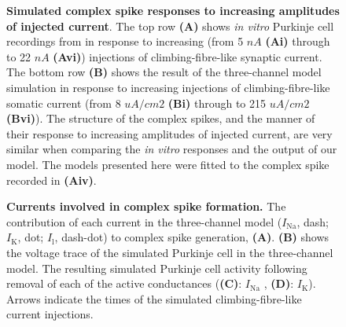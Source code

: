 \documentclass[utf8]{frontiersSCNS} %
\renewcommand{\k}{\mathrm{K}}
\newcommand{\na}{\mathrm{Na}}
\newcommand{\leak}{\mathrm{l}}
\begin{document}

%


\begin{figure}[!ht]
\caption{\textbf{Simulated complex spike responses to increasing
    amplitudes of injected current}. The top row \textbf{(A)} shows \textsl{in
    vitro} Purkinje cell recordings from \protect\cite{DavieEtAl2008} in response to increasing (from 5 $nA$ \textbf{(Ai)} through to 22 $nA$ \textbf{(Avi)}) injections of climbing-fibre-like synaptic current. The bottom row \textbf{(B)} shows
  the result of the three-channel model simulation in response to increasing injections of climbing-fibre-like somatic current (from 8 $uA/cm2$ \textbf{(Bi)} through to 215 $uA/cm2$ \textbf{(Bvi)}). The structure of the complex spikes, and the manner of their response to increasing amplitudes of injected current, are very similar when comparing the \textsl{in vitro} responses and the output of our model. The models presented here were fitted to the complex spike recorded in \textbf{(Aiv)}.}
\label{injection_amplitudes}
\end{figure}



\begin{figure}[!ht]
\caption{\textbf{Currents involved in complex spike formation.} The
contribution of each current in the three-channel model ($I_{\na}$,
dash; $I_{\k}$, dot; $I_{\leak}$, dash-dot) to
complex spike generation, \textbf{(A)}. \textbf{(B)} shows the
 voltage trace of the simulated Purkinje cell in the three-channel model. The resulting simulated Purkinje cell activity
following removal of each of the active conductances (\textbf{(C)}: $I_{\na}$
, \textbf{(D)}: $I_{\k}$). Arrows
indicate the times of the simulated climbing-fibre-like current
injections.}
\label{currents}
\end{figure}
\end{document}
